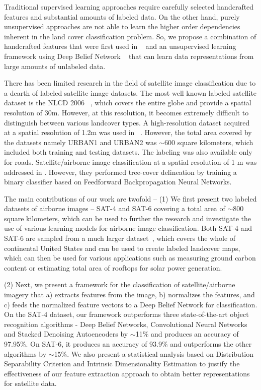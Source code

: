 \documentclass[11pt,a4paper]{article}
\begin{document}
Traditional supervised learning approaches require carefully selected handcrafted features and substantial amounts of labeled data. On the other hand, purely unsupervised approaches are not able to learn the higher order dependencies inherent in the land cover classification problem. So, we propose a combination of handcrafted features that were first used in ~\cite{haralick1973} and an unsupervised learning framework using Deep Belief Network ~\cite{Hinton06afast} that can learn data representations from large amounts of unlabeled data.

There has been limited research in the field of satellite image classification due to a dearth of labeled satellite image datasets. The most well known labeled satellite dataset is the NLCD 2006 ~\cite{wickham2013}, which covers the entire globe and provide a spatial resolution of 30m. However, at this resolution, it becomes extremely difficult to distinguish between various landcover types. A high-resolution dataset acquired at a spatial resolution of 1.2m was used in ~\cite{MnihHinton2010}. However, the total area covered by the datasets namely URBAN1 and URBAN2 was ${\sim}600$ square kilometers, which included both training and testing datasets. The labeling was also available only for roads. Satellite/airborne image classification at a spatial resolution of 1-m was addressed in \cite{basu2015}. However, they performed tree-cover delineation by training a binary classifier based on Feedforward Backpropagation Neural Networks. 

The main contributions of our work are twofold -- (1) We first present two labeled datasets of airborne images -- SAT-4 and SAT-6 covering a total area of ${\sim}800$ square kilometers, which can be used to further the research and investigate the use of various learning models for airborne image classification. Both SAT-4 and SAT-6 are sampled from a much larger dataset~\cite{naip}, which covers the whole of continental United States and can be used to create labeled landcover maps, which can then be used for various applications such as measuring ground carbon content or estimating total area of rooftops for solar power generation. 

(2) Next, we present a framework for the classification of satellite/airborne imagery that a) extracts features from the image, b) normalizes the features, and c) feeds the normalized feature vectors to a Deep Belief Network for classification. On the SAT-4 dataset, our framework outperforms three state-of-the-art object recognition algorithms - Deep Belief Networks, Convolutional Neural Networks and Stacked Denoising Autoencoders by $\sim$11\% and produces an accuracy of 97.95\%. On SAT-6, it produces an accuracy of 93.9\% and outperforms the other algorithms by $\sim$15\%. We also present a statistical analysis based on Distribution Separability Criterion and Intrinsic Dimensionality Estimation to justify the effectiveness of our feature extraction approach to obtain better representations for satellite data.      
\end{document}
